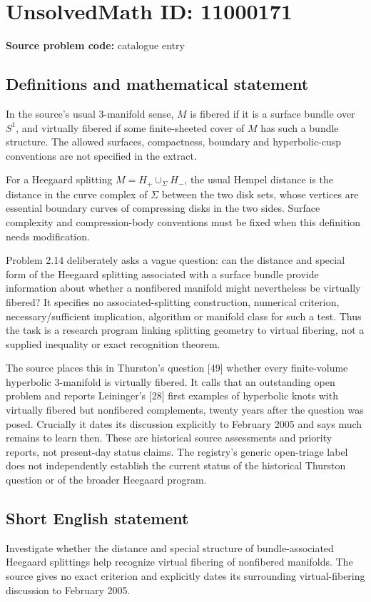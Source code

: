 \documentclass[11pt]{article}
\begin{document}
\section*{UnsolvedMath ID: 11000171}
\textbf{Source problem code:} catalogue entry
\subsection{Definitions and mathematical statement}
In the source's usual \(3\)-manifold sense, \(M\) is fibered if it is a surface bundle over \(S^1\), and virtually fibered if some finite-sheeted cover of \(M\) has such a bundle structure. The allowed surfaces, compactness, boundary and hyperbolic-cusp conventions are not specified in the extract.

For a Heegaard splitting \(M=H_+\cup_\Sigma H_-\), the usual Hempel distance is the distance in the curve complex of \(\Sigma\) between the two disk sets, whose vertices are essential boundary curves of compressing disks in the two sides. Surface complexity and compression-body conventions must be fixed when this definition needs modification.

Problem 2.14 deliberately asks a vague question: can the distance and special form of the Heegaard splitting associated with a surface bundle provide information about whether a nonfibered manifold might nevertheless be virtually fibered? It specifies no associated-splitting construction, numerical criterion, necessary/sufficient implication, algorithm or manifold class for such a test. Thus the task is a research program linking splitting geometry to virtual fibering, not a supplied inequality or exact recognition theorem.

The source places this in Thurston's question [49] whether every finite-volume hyperbolic \(3\)-manifold is virtually fibered. It calls that an outstanding open problem and reports Leininger's [28] first examples of hyperbolic knots with virtually fibered but nonfibered complements, twenty years after the question was posed. Crucially it dates its discussion explicitly to February 2005 and says much remains to learn then. These are historical source assessments and priority reports, not present-day status claims. The registry's generic open-triage label does not independently establish the current status of the historical Thurston question or of the broader Heegaard program.
\subsection{Short English statement}
Investigate whether the distance and special structure of bundle-associated Heegaard splittings help recognize virtual fibering of nonfibered manifolds. The source gives no exact criterion and explicitly dates its surrounding virtual-fibering discussion to February 2005.
\end{document}
